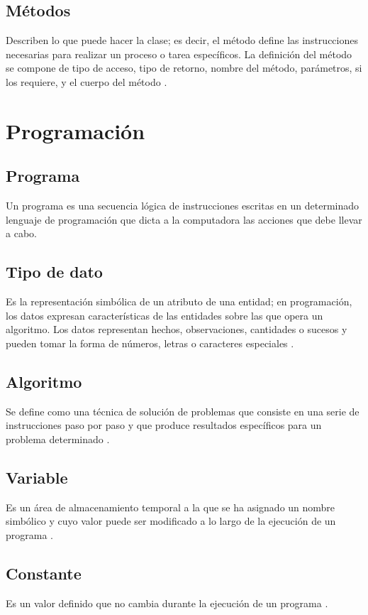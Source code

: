 \subsection{Métodos}
Describen lo que puede hacer la clase; es decir, el método define las instrucciones necesarias para realizar un proceso o tarea específicos. La definición del método se compone de tipo de acceso, tipo de retorno, nombre del método, parámetros, si los requiere, y el cuerpo del método \citep{izquierdo2007introduccion}.

\section{Programación}

\subsection{Programa}
Un programa es una secuencia lógica de instrucciones escritas en un determinado lenguaje de programación que dicta a la computadora las acciones que debe llevar a cabo.

\subsection{Tipo de dato}
Es la representación simbólica de un atributo de una entidad; en programación, los datos expresan características de las entidades sobre las que opera un algoritmo. Los datos representan hechos, observaciones, cantidades o sucesos y pueden tomar la forma de números, letras o caracteres especiales \citep{izquierdo2007introduccion}.

\subsection{Algoritmo}
Se define como una técnica de solución de problemas que consiste en una serie de instrucciones paso por paso y que produce resultados específicos para un problema determinado \citep{izquierdo2007introduccion}. 

\subsection{Variable}
Es un área de almacenamiento temporal a la que se ha asignado un nombre simbólico y cuyo valor puede ser modificado a lo largo de la ejecución de un programa \citep{izquierdo2007introduccion}. 

\subsection{Constante}
Es un valor definido que no cambia durante la ejecución de un programa \citep{izquierdo2007introduccion}. 

